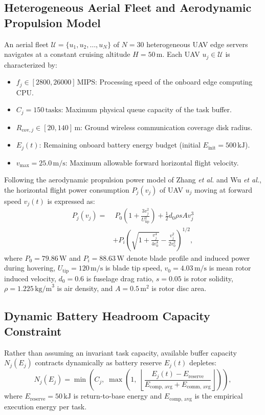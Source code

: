 \documentclass[journal]{IEEEtran}
\begin{document}
\subsection{Heterogeneous Aerial Fleet and Aerodynamic Propulsion Model}
An aerial fleet $\mathcal{U} = \{u_1, u_2, \dots, u_N\}$ of $N = 30$ heterogeneous UAV edge servers navigates at a constant cruising altitude $H = 50\,\text{m}$. Each UAV $u_j \in \mathcal{U}$ is characterized by:
\begin{itemize}
    \item $f_j \in [2800, 26000]\,\text{MIPS}$: Processing speed of the onboard edge computing CPU.
    \item $C_j = 150\,\text{tasks}$: Maximum physical queue capacity of the task buffer.
    \item $R_{\text{cov}, j} \in [20, 140]\,\text{m}$: Ground wireless communication coverage disk radius.
    \item $E_j(t)$: Remaining onboard battery energy budget (initial $E_{\text{init}} = 500\,\text{kJ}$).
    \item $v_{\text{max}} = 25.0\,\text{m/s}$: Maximum allowable forward horizontal flight velocity.
\end{itemize}

Following the aerodynamic propulsion power model of Zhang \textit{et al.} and Wu \textit{et al.}, the horizontal flight power consumption $P_j(v_j)$ of UAV $u_j$ moving at forward speed $v_j(t)$ is expressed as:
\begin{equation}
\begin{aligned}
    P_j(v_j) = & \; P_0 \left(1 + \frac{3 v_j^2}{U_{\text{tip}}^2}\right) + \frac{1}{2} d_0 \rho s A v_j^3 \\
    & + P_i \left(\sqrt{1 + \frac{v_j^4}{4 v_0^4}} - \frac{v_j^2}{2 v_0^2}\right)^{1/2},
\end{aligned}
\label{eq:propulsion}
\end{equation}
where $P_0 = 79.86\,\text{W}$ and $P_i = 88.63\,\text{W}$ denote blade profile and induced power during hovering, $U_{\text{tip}} = 120\,\text{m/s}$ is blade tip speed, $v_0 = 4.03\,\text{m/s}$ is mean rotor induced velocity, $d_0 = 0.6$ is fuselage drag ratio, $s = 0.05$ is rotor solidity, $\rho = 1.225\,\text{kg/m}^3$ is air density, and $A = 0.5\,\text{m}^2$ is rotor disc area.

\subsection{Dynamic Battery Headroom Capacity Constraint}
Rather than assuming an invariant task capacity, available buffer capacity $N_j(E_j)$ contracts dynamically as battery reserve $E_j(t)$ depletes:
\begin{equation}
    N_j(E_j) = \min \left(C_j, \; \max\left(1, \; \left\lfloor \frac{E_j(t) - E_{\text{reserve}}}{E_{\text{comp, avg}} + E_{\text{comm, avg}}} \right\rfloor\right)\right),
\end{equation}
where $E_{\text{reserve}} = 50\,\text{kJ}$ is return-to-base energy and $E_{\text{comp, avg}}$ is the empirical execution energy per task.
\end{document}
